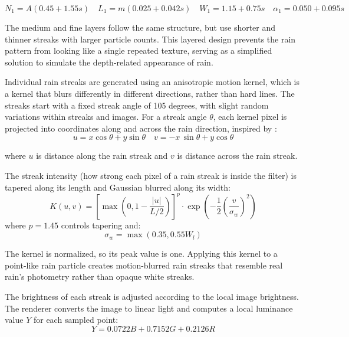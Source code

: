 \documentclass[10pt,letterpaper]{article}
\begin{document}
\begin{equation}
N_1=A(0.45+1.55s) \quad L_1=m(0.025+0.042s) \quad W_1=1.15+0.75s \quad \alpha_1=0.050+0.095s
\label{eq:simple-layer-params}
\end{equation}

The medium and fine layers follow the same structure, but use shorter and thinner streaks 
with larger particle counts. This layered design prevents the rain pattern from looking like a 
single repeated texture, serving as a simplified solution to simulate the depth-related appearance of rain.

Individual rain streaks are generated using an anisotropic motion kernel, which is a kernel that blurs
differently in different directions, rather than hard lines. The streaks start with a fixed streak angle of 105 degrees, with slight random variations within streaks and images. 
For a streak angle $\theta$, each kernel pixel is projected into coordinates along and across the
rain direction, inspired by \textcite{bakosPrototypeInteractiveDynamic}:
\begin{equation}
u=x\cos\theta + y\sin\theta \quad v = -x\,\sin\theta + y\cos\theta
\label{eq:rain-kernel-coordinates}
\end{equation}

where $u$ is distance along the rain streak and $v$ is distance across the rain streak.

The streak intensity (how strong each pixel of a rain streak is inside the filter) is tapered along its length
and Gaussian blurred along its width:
\begin{equation}
K(u,v)=\left[\max\left(0,1-\frac{|u|}{L/2}\right)\right]^p \cdot \exp\left(-\frac{1}{2}\left(\frac{v}{\sigma_w}\right)^2\right)
\label{eq:anisotropic-motion-kernel}
\end{equation}
where $p=1.45$ controls tapering and:
\begin{equation}
\sigma_w = \max(0.35, 0.55W_l)
\label{eq:rain-kernel-width}
\end{equation}

The kernel is normalized, so its peak value is one. Applying this kernel to a point-like rain particle creates
motion-blurred rain streaks that resemble real rain's photometry rather than opaque white streaks.

The brightness of each streak is adjusted according to the local image brightness. The renderer converts the image to linear light and computes a local luminance value $Y$ for each sampled point:
\begin{equation}
Y=0.0722B+0.7152G+0.2126R
\label{eq:linear-luminance}
\end{equation}
\end{document}
